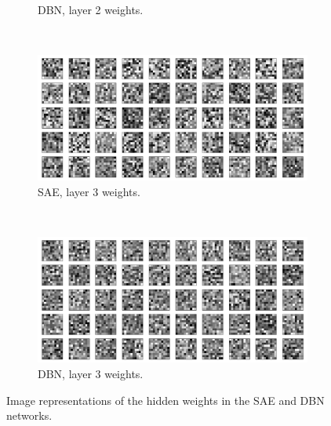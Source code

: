 \documentclass{article}
\begin{document}
\begin{figure}[!ht]
\begin{subfigure}[t]{0.47\textwidth}
    \caption{DBN, layer 2 weights.}
    \label{fig:dbnl2}
  \end{subfigure}
  \addtocounter{subfigure}{-2}
  ~
  \begin{subfigure}[t]{0.47\textwidth}
    \centering
    \includegraphics[width=\textwidth]{../plots/3_2_1/sae_3l.png}
    \caption{SAE, layer 3 weights.}
    \label{fig:sael3}
  \end{subfigure}
  \addtocounter{subfigure}{1}
  ~
  \begin{subfigure}[t]{0.47\textwidth}
    \centering
    \includegraphics[width=\textwidth]{../plots/3_2_1/dbn_3l.png}
    \caption{DBN, layer 3 weights.}
    \label{fig:dbnl3}
  \end{subfigure}
  \caption{
    Image representations of the hidden weights in the SAE and DBN networks.
  }
  \label{fig:hiddenweightsdeep}
\end{figure}
\end{document}
